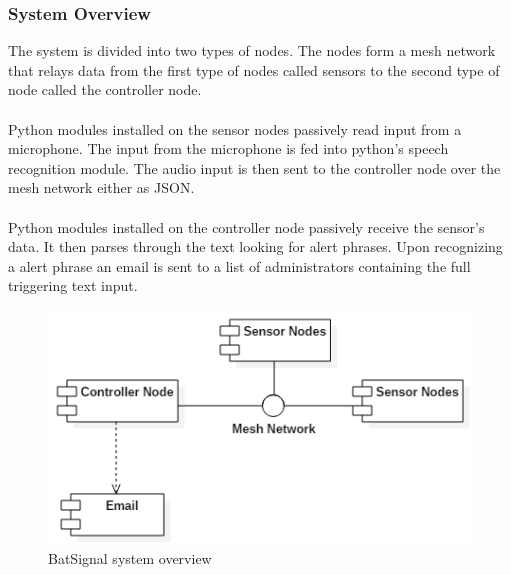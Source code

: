 \documentclass[11pt,a4paper]{article}
\begin{document}
\subsubsection{System Overview}
The system is divided into two types of nodes.  The nodes form a mesh network that relays data from the first type of nodes called sensors to the second type of node called the controller node. \\\\
Python modules installed on the sensor nodes passively read input from a microphone. The input from the microphone is fed into python's speech recognition module. The audio input is then sent to the controller node over the mesh network either as JSON. \\\\
Python modules installed on the controller node passively receive the sensor's data.  It then parses through the text looking for alert phrases.  Upon recognizing a alert phrase an email is sent to a list of administrators containing the full triggering text input.
\begin{figure}[H]
	\centering
		\includegraphics[scale=0.75, keepaspectratio=true]{Graphics/SimpleOverview.png}
	\caption{BatSignal system overview}
\end{figure}
\end{document}
